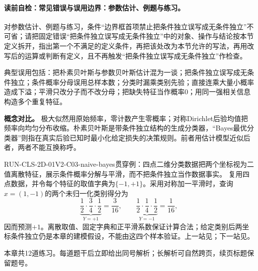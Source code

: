 \label{struct:V2-C03-CH30}
\paragraph{读前自检：常见错误与误用边界：参数估计、例题与练习。}对参数估计、例题与练习，条件“边界框首项禁止把条件独立误写成无条件独立”不可省；请把固定错误“把条件独立误写成无条件独立”中的对象、操作与结论按本节定义拆开，指出第一个不满足的定义条件，再把该处改为本节允许的写法，再用改写后的运算或判断有定义，且不再触发“把条件独立误写成无条件独立”作检查。\par

\begin{warningbox}
典型误用包括：把朴素贝叶斯与参数贝叶斯估计混为一谈；把条件独立误写成无条件独立；条件概率分母误用总样本数；分类时漏乘类别先验；直接连乘大量小概率造成下溢；平滑只改分子而不改分母；把缺失特征当作概率0；用同一强相关信息构造多个重复特征。
\end{warningbox}

\label{struct:V2-C03-CH31}
\begin{comparisonbox}
\textbf{概念对比。}
极大似然用原始频率，零计数产生零概率；对称Dirichlet后验均值把频率向均匀分布收缩。朴素贝叶斯是带条件独立结构的生成分类器，“Bayes最优分类器”则指在真实后验已知时最小化给定损失的决策规则。前者用估计模型近似后者，两者不能互换称呼。
\end{comparisonbox}

\begin{SLRunningExample}{RUN-CLS-2D-01}{V2-C03-naive-bayes}{贯穿例：四点二维分类数据}{把两个坐标视为二值离散特征，展示条件概率分解与平滑，而不把条件独立当作数据事实。}
复用四点数据，并令每个特征的取值字典为$\{-1,+1\}$。采用对称加一平滑时，查询$x=(1,-1)$的两个未归一化类别得分为
\[
\underbrace{\frac12\cdot\frac34\cdot\frac12}_{Y=+1}=\frac{3}{16},
\qquad
\underbrace{\frac12\cdot\frac14\cdot\frac12}_{Y=-1}=\frac{1}{16},
\]
因而预测$+1$。离散取值、固定字典和正平滑系数保证计算合法；给定类别后两坐标条件独立仍是本章的建模假设，不能由这四个样本验证。上一站见；下一站见。
\end{SLRunningExample}


\label{struct:V2-C03-CH34}
\begin{chapterexercisebox}
\label{struct:V2-C03-CH35}
本章共12道练习。每道题干后立即给出同号解析；长解析可自然跨页，续页标题保留题号。
\end{chapterexercisebox}

